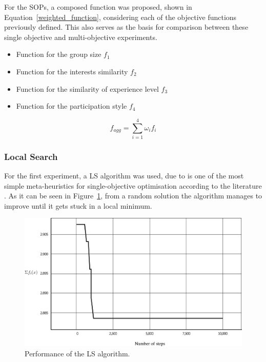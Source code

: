 For the SOPs, a composed function was proposed, shown in Equation~\ref{weighted_function}, considering each of the objective functions previously defined. This also serves as the basis for comparison between these single objective and multi-objective experiments.\\

\begin{itemize}
\item Function for the group size \(f_{1}\)
\item Function for the interests similarity \(f_{2}\)
\item Function for the similarity of experience level \(f_{3}\)
\item Function for the participation style \(f_{4}\)
\end{itemize}

\begin{equation} \label{weighted_function}
    f_{agg} = \sum_{i=1}^4 \omega_i f_i
\end{equation}

\subsubsection{Local Search}

For the first experiment, a LS algorithm was used, due to is one of the most simple meta-heuristics for single-objective optimisation according to the literature \cite{boussaid2013survey}. As it can be seen in Figure~\ref{fig:local_search}, from a random solution the algorithm manages to improve until it gets stuck in a local minimum.\\

\begin{figure}
    \centering
    \includegraphics[width=\textwidth]{images/local_search.png}
    \caption{Performance of the LS algorithm.}
    \label{fig:local_search}
\end{figure}

